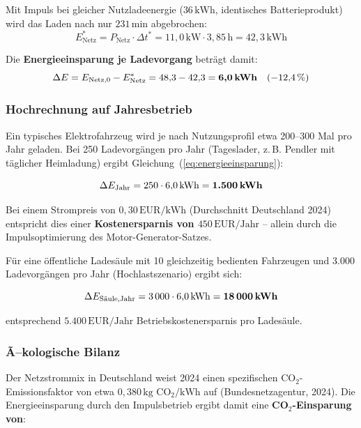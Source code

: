 ﻿\documentclass[a4paper,12pt]{article}
\begin{document}
Mit Impuls bei gleicher Nutzladeenergie ($36\,\text{kWh}$, identisches
Batterieprodukt) wird das Laden nach nur $231\,\text{min}$ abgebrochen:
\begin{equation}
  E_\text{Netz}^* = P_\text{Netz} \cdot \Delta t^*
  = 11{,}0\,\text{kW} \cdot 3{,}85\,\text{h} = 42{,}3\,\text{kWh}
\end{equation}

Die \textbf{Energieeinsparung je Ladevorgang} beträgt damit:
\begin{equation}
  \Delta E = E_\text{Netz,0} - E_\text{Netz}^*
  = 48{,}3 - 42{,}3 = \textbf{6{,}0\,\text{kWh}}
  \quad (-12{,}4\,\%)
  \label{eq:energieeinsparung}
\end{equation}

\subsubsection{Hochrechnung auf Jahresbetrieb}

Ein typisches Elektrofahrzeug wird je nach Nutzungsprofil etwa
200--300 Mal pro Jahr geladen. Bei 250 Ladevorgängen pro Jahr
(Tageslader, z.\,B. Pendler mit täglicher Heimladung) ergibt
Gleichung~(\ref{eq:energieeinsparung}):

\begin{equation}
  \Delta E_\text{Jahr} = 250 \cdot 6{,}0\,\text{kWh} = \textbf{1.500\,\text{kWh}}
\end{equation}

Bei einem Strompreis von $0{,}30\,\text{EUR/kWh}$ (Durchschnitt Deutschland
2024) entspricht dies einer \textbf{Kostenersparnis von
$450\,\text{EUR/Jahr}$} -- allein durch die Impulsoptimierung des
Motor-Generator-Satzes.

Für eine öffentliche Ladesäule mit 10 gleichzeitig bedienten Fahrzeugen
und 3.000 Ladevorgängen pro Jahr (Hochlastszenario) ergibt sich:

\begin{equation}
  \Delta E_\text{Säule,Jahr} = 3\,000 \cdot 6{,}0\,\text{kWh}
  = \textbf{18\,000\,\text{kWh}}
\end{equation}

entsprechend $5.400\,\text{EUR/Jahr}$ Betriebskostenersparnis pro Ladesäule.

\subsubsection{Ã–kologische Bilanz}

Der Netzstrommix in Deutschland weist 2024 einen spezifischen
CO${}_2$-Emissionsfaktor von etwa $0{,}380\,\text{kg CO${}_2$/kWh}$ auf
(Bundesnetzagentur, 2024). Die Energieeinsparung durch den Impulsbetrieb
ergibt damit eine \textbf{CO${}_2$-Einsparung von}:
\end{document}
